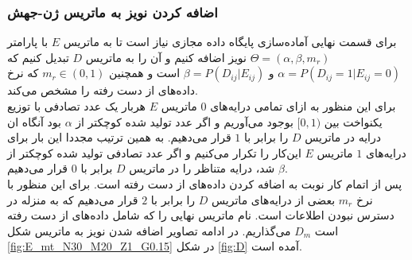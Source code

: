 \subsubsection{اضافه کردن نویز به ماتریس ژن-جهش}
برای قسمت نهایی آماده‌سازی پایگاه داده مجازی نیاز است تا به ماتریس $E$ با پارامتر $\Theta=(\alpha, \beta, m_r)$ نویز اضافه کنیم و آن را به ماتریس $D$ تبدیل کنیم که $\alpha=P(D_{ij}=1|E_{ij}=0)$ و $\beta=P(D_{ij}|E_{ij})$ است و همچنین $m_r\in(0,1)$ که نرخ داده‌های از دست رفته را مشخص می‌کند.
\\
برای این منظور به ازای تمامی درایه‌های $0$ ماتریس $E$ هربار یک عدد تصادفی با توزیع یکنواخت بین $[0,1)$ بوجود می‌آوریم و اگر عدد تولید شده کوچکتر از $\alpha$ بود آنگاه ان درایه در ماتریس $D$ را برابر با $1$ قرار می‌دهیم. به همین ترتیب مجددا این بار برای درایه‌های $1$ ماتریس $E$ این‌کار را تکرار می‌کنیم و اگر عدد تصادفی تولید شده کوچکتر از $\beta$ شد، درایه متناظر را در ماتریس $D$ برابر با $0$ قرار می‌دهیم.
\\
پس از اتمام کار نوبت به اضافه کردن داده‌های از دست رفته است. برای این منظور با نرخ $m_r$ بعضی از درایه‌های ماتریس $D$ را برابر با $2$ قرار می‌دهیم که به منزله در دسترس نبودن اطلاعات است. نام ماتریس نهایی را که شامل داده‌های از دست رفته است $D_m$ می‌گذاریم. در ادامه تصاویر اضافه شدن نویز به ماتریس شکل \ref{fig:E_mt_N30_M20_Z1_G0.15} در شکل \ref{fig:D} آمده است.
